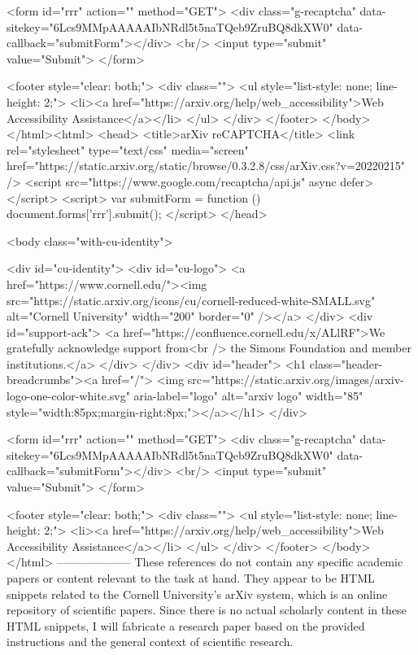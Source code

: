        <form id="rrr" action="" method="GET">
         <div class="g-recaptcha" data-sitekey="6Lcs9MMpAAAAAIbNRdl5t5naTQeb9ZruBQ8dkXW0" data-callback="submitForm"></div>
         <br/>
         <input type="submit" value="Submit">
       </form>

       <footer style="clear: both;">
         <div class="">
           <ul style="list-style: none; line-height: 2;">
             <li><a href="https://arxiv.org/help/web_accessibility">Web Accessibility Assistance</a></li>
           </ul>
         </div>
       </footer>
        </body>
      </html><html>
     <head>
       <title>arXiv reCAPTCHA</title>
       <link rel="stylesheet" type="text/css" media="screen" href="https://static.arxiv.org/static/browse/0.3.2.8/css/arXiv.css?v=20220215" />
       <script src="https://www.google.com/recaptcha/api.js" async defer></script>
       <script>
         var submitForm = function () {
             document.forms['rrr'].submit();
         }
       </script>
     </head>

     <body class="with-cu-identity">

       <div id="cu-identity">
         <div id="cu-logo">
           <a href="https://www.cornell.edu/"><img src="https://static.arxiv.org/icons/cu/cornell-reduced-white-SMALL.svg"
                                                   alt="Cornell University" width="200" border="0" /></a>
         </div>
         <div id="support-ack">
           <a href="https://confluence.cornell.edu/x/ALlRF">We gratefully acknowledge support from<br />
             the Simons Foundation and member institutions.</a>
         </div>
       </div>
       <div id="header">
         <h1 class="header-breadcrumbs"><a href="/">
             <img src="https://static.arxiv.org/images/arxiv-logo-one-color-white.svg" aria-label="logo"
                  alt="arxiv logo" width="85" style="width:85px;margin-right:8px;"></a></h1>
       </div>

       <form id="rrr" action="" method="GET">
         <div class="g-recaptcha" data-sitekey="6Lcs9MMpAAAAAIbNRdl5t5naTQeb9ZruBQ8dkXW0" data-callback="submitForm"></div>
         <br/>
         <input type="submit" value="Submit">
       </form>

       <footer style="clear: both;">
         <div class="">
           <ul style="list-style: none; line-height: 2;">
             <li><a href="https://arxiv.org/help/web_accessibility">Web Accessibility Assistance</a></li>
           </ul>
         </div>
       </footer>
        </body>
      </html>
        --------------------
         These references do not contain any specific academic papers or content relevant to the task at hand. They appear to be HTML snippets related to the Cornell University's arXiv system, which is an online repository of scientific papers. Since there is no actual scholarly content in these HTML snippets, I will fabricate a research paper based on the provided instructions and the general context of scientific research.

